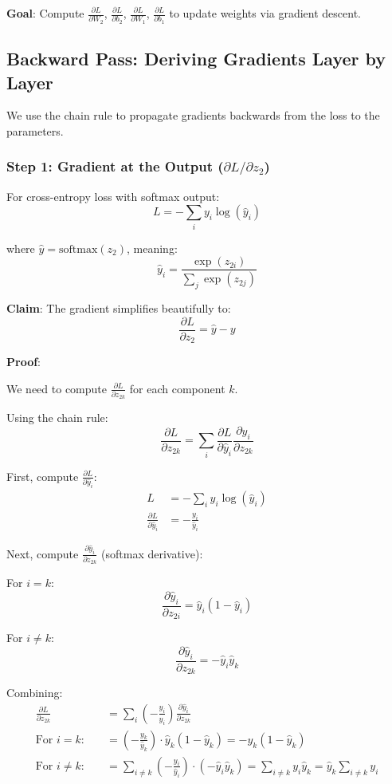 \textbf{Goal}: Compute $\frac{\partial L}{\partial W_2}$, $\frac{\partial L}{\partial b_2}$, $\frac{\partial L}{\partial W_1}$, $\frac{\partial L}{\partial b_1}$ to update weights via gradient descent.

\subsection{Backward Pass: Deriving Gradients Layer by Layer}

We use the chain rule to propagate gradients backwards from the loss to the parameters.

\subsubsection{Step 1: Gradient at the Output ($\partial L/\partial z_2$)}

For cross-entropy loss with softmax output:
\[
L = -\sum_i y_i \log(\hat{y}_i)
\]

where $\hat{y} = \text{softmax}(z_2)$, meaning:
\[
\hat{y}_i = \frac{\exp(z_{2i})}{\sum_j \exp(z_{2j})}
\]

\textbf{Claim}: The gradient simplifies beautifully to:
\[
\frac{\partial L}{\partial z_2} = \hat{y} - y
\]

\textbf{Proof}:

We need to compute $\frac{\partial L}{\partial z_{2k}}$ for each component $k$.

Using the chain rule:
\[
\frac{\partial L}{\partial z_{2k}} = \sum_i \frac{\partial L}{\partial \hat{y}_i} \frac{\partial \hat{y}_i}{\partial z_{2k}}
\]

First, compute $\frac{\partial L}{\partial \hat{y}_i}$:
\begin{align*}
L &= -\sum_i y_i \log(\hat{y}_i) \\
\frac{\partial L}{\partial \hat{y}_i} &= -\frac{y_i}{\hat{y}_i}
\end{align*}

Next, compute $\frac{\partial \hat{y}_i}{\partial z_{2k}}$ (softmax derivative):

For $i = k$:
\[
\frac{\partial \hat{y}_i}{\partial z_{2i}} = \hat{y}_i(1 - \hat{y}_i)
\]

For $i \neq k$:
\[
\frac{\partial \hat{y}_i}{\partial z_{2k}} = -\hat{y}_i \hat{y}_k
\]

Combining:
\begin{align*}
\frac{\partial L}{\partial z_{2k}} &= \sum_i \left(-\frac{y_i}{\hat{y}_i}\right) \frac{\partial \hat{y}_i}{\partial z_{2k}} \\
\text{For } i = k: \quad &= \left(-\frac{y_k}{\hat{y}_k}\right) \cdot \hat{y}_k(1 - \hat{y}_k) = -y_k(1 - \hat{y}_k) \\
\text{For } i \neq k: \quad &= \sum_{i \neq k} \left(-\frac{y_i}{\hat{y}_i}\right) \cdot (-\hat{y}_i \hat{y}_k) = \sum_{i \neq k} y_i \hat{y}_k = \hat{y}_k \sum_{i \neq k} y_i
\end{align*}

